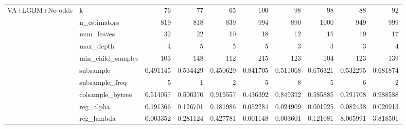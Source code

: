 \documentclass[12pt,twoside]{report}
\begin{document}
\begin{longtable}{llrrrrrrrr}
\multirow{10}{*}{VA+LGBM+No odds} & k                          & 76                       & 77                       & 65                       & 100                      & 98                       & 98                       & 88                       & 92                        \\*
                                  & n\_estimators              & 819                      & 818                      & 839                      & 994                      & 890                      & 1000                     & 949                      & 999                       \\*
                                  & num\_leaves                & 32                       & 22                       & 10                       & 18                       & 12                       & 15                       & 19                       & 17                        \\*
                                  & max\_depth                 & 4                        & 5                        & 5                        & 5                        & 3                        & 3                        & 3                        & 4                         \\*
                                  & min\_child\_samples        & 103                      & 148                      & 112                      & 215                      & 123                      & 104                      & 123                      & 139                       \\*
                                  & subsample                  & 0.491145                 & 0.534429                 & 0.450629                 & 0.841705                 & 0.511068                 & 0.676321                 & 0.532295                 & 0.681874                  \\*
                                  & subsample\_freq            & 5                        & 1                        & 2                        & 5                        & 8                        & 5                        & 6                        & 2                         \\*
                                  & colsample\_bytree          & 0.514057                 & 0.500370                 & 0.919557                 & 0.436392                 & 0.849392                 & 0.585885                 & 0.791708                 & 0.988588                  \\*
                                  & reg\_alpha                 & 0.191366                 & 0.126701                 & 0.181986                 & 0.052284                 & 0.024909                 & 0.001925                 & 0.082438                 & 0.020913                  \\*
                                  & reg\_lambda                & 0.003352                 & 0.281124                 & 0.427781                 & 0.001148                 & 0.003601                 & 0.121081                 & 8.005991                 & 3.818501                  \\
\bottomrule
\end{longtable}
\normalsize
\end{document}
